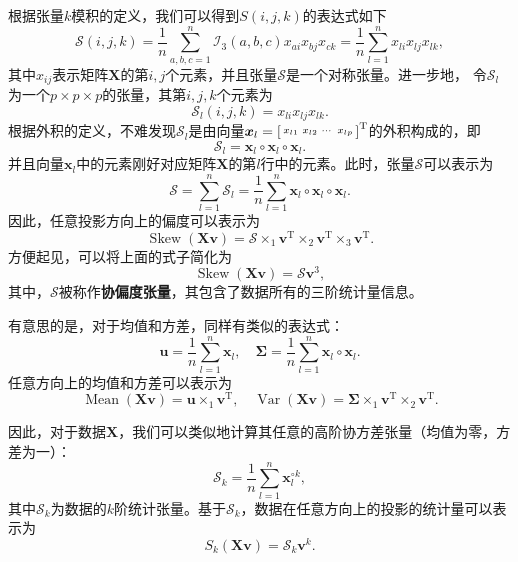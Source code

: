 根据张量\( k \)模积的定义，我们可以得到\( S(i, j, k) \)的表达式如下
\[
    \mathcal{S}(i, j, k) = \frac{1}{n} \sum_{a, b, c = 1}^n \mathcal{I}_3(a, b, c) x_{ai} x_{bj} x_{ck} = \frac{1}{n} \sum_{l=1}^n x_{li} x_{lj} x_{lk},
\]
其中\( x_{ij} \)表示矩阵\( \mathbf{X} \)的第\( i, j \)个元素，并且张量\( \mathcal{S} \)是一个对称张量。进一步地， 令\( \mathcal{S}_l \) 为一个\( p \times p \times p \)的张量，其第\( i, j, k \)个元素为
\[
    \mathcal{S}_l(i, j, k) = x_{li} x_{lj} x_{lk}.
\]
根据外积的定义，不难发现\( \mathcal{S}_l \)是由向量\( \boldsymbol{x}_l = \begin{bsmallmatrix} x_{l1} & x_{l2} & \cdots & x_{lp} \end{bsmallmatrix}^{\mathrm{T}} \)的外积构成的，即
\[
    \mathcal{S}_l = \bm{x}_l \circ \bm{x}_l \circ \bm{x}_l.
\]
并且向量\( \bm{x}_l \)中的元素刚好对应矩阵\( \mathbf{X} \)的第\( l \)行中的元素。此时，张量\( \mathcal{S} \)可以表示为
\[
    \mathcal{S} = \sum_{l=1}^n \mathcal{S}_l = \frac{1}{n} \sum_{l=1}^n \bm{x}_l \circ \bm{x}_l \circ \bm{x}_l.
\]
因此，任意投影方向上的偏度可以表示为
\[
    \operatorname{Skew}(\mathbf{X} \bm{v}) = \mathcal{S} \times_1 \bm{v}^{\mathrm{T}} \times_2 \bm{v}^{\mathrm{T}} \times_3 \bm{v}^{\mathrm{T}}.
\]
方便起见，可以将上面的式子简化为
\[
    \operatorname{Skew}(\mathbf{X} \bm{v}) = \mathcal{S} \bm{v}^3,
\]
其中，\( \mathcal{S} \)被称作\textbf{协偏度张量}，其包含了数据所有的三阶统计量信息。

有意思的是，对于均值和方差，同样有类似的表达式：
\[
    \bm{u} = \frac{1}{n} \sum_{l=1}^n \bm{x}_l, \quad \mathbf{\Sigma} = \frac{1}{n} \sum_{l=1}^n \bm{x}_l \circ \bm{x}_l.
\]
任意方向上的均值和方差可以表示为
\[
    \operatorname{Mean}(\mathbf{X} \bm{v}) = \bm{u} \times_1 \bm{v}^{\mathrm{T}}, \quad \operatorname{Var}(\mathbf{X} \bm{v}) = \mathbf{\Sigma} \times_1 \bm{v}^{\mathrm{T}} \times_2 \bm{v}^{\mathrm{T}}.
\]

因此，对于数据\( \mathbf{X} \)，我们可以类似地计算其任意的高阶协方差张量（均值为零，方差为一）：
\[
    \mathcal{S}_k = \frac{1}{n} \sum_{l=1}^n \bm{x}_l^{\circ k},
\]
其中\( \mathcal{S}_k \)为数据的\( k \)阶统计张量。基于\( \mathcal{S}_k \)，数据在任意方向上的投影的统计量可以表示为
\[
    S_k(\mathbf{X} \bm{v}) = \mathcal{S}_k \bm{v}^k.
\]


